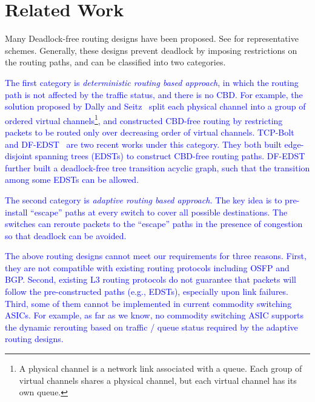 \section{Related Work}\label{sec:related}

 Many Deadlock-free routing designs have been
proposed. See
\cite{dally,duato93,dally93,sancho2004,flich2012survey,lash,wu2003fault,glass,duato2001,domke2011,puente1999,dfedst16}
for representative schemes. Generally, these designs prevent deadlock by
imposing restrictions on the routing paths, and can be classified into two
categories.

\textcolor{blue}{The first category is {\em deterministic routing based approach}, in which the
routing path is not affected by the traffic status, and there is no CBD. For example, the solution proposed by Dally and Seitz~\cite{dally} split each physical channel  into a group of ordered virtual channels\footnote{A physical channel is a network link associated with a queue. Each group of virtual channels shares a physical channel, but each virtual channel has its own queue.}, and constructed CBD-free routing by restricting packets to be routed only over decreasing order of virtual channels.
TCP-Bolt~\cite{tcpbolt} and DF-EDST~\cite{dfedst16} are two recent works under this category. They both built edge-disjoint spanning trees (EDSTs) to construct CBD-free routing paths. DF-EDST further built a deadlock-free tree transition acyclic graph, such that the transition among some EDSTs can be allowed.}

\textcolor{blue}{The second category is {\em adaptive routing based approach.} The key idea is to pre-install  ``escape'' paths at every switch to cover all possible
destinations. The switches can reroute packets to the ``escape'' paths in the
presence of congestion so that deadlock can be avoided.}


\textcolor{blue}{The above routing designs cannot meet our requirements for three reasons. First, they are not compatible with existing routing protocols including OSFP and BGP. Second, existing L3 routing protocols do not guarantee that packets will follow the pre-constructed paths (e.g., EDSTs), especially upon link failures. Third, some of them cannot be implemented in current commodity switching ASICs. For example, as far as we know, no commodity switching ASIC supports the dynamic rerouting based on traffic / queue status required by the adaptive routing designs.}

